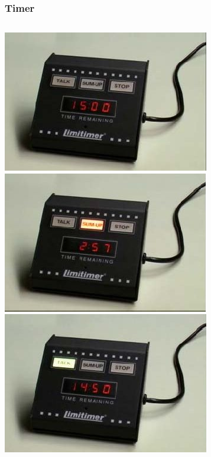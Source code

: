 \documentclass{beamer}
\begin{document}
\begin{frame}
\frametitle{Timer}

\begin{columns}[c]
\includegraphics[width=\columnwidth]{before}\\
\includegraphics[width=\columnwidth]{wrapup}
\includegraphics[width=\columnwidth]{during}\\

\end{columns}
\end{frame}
\end{document}

